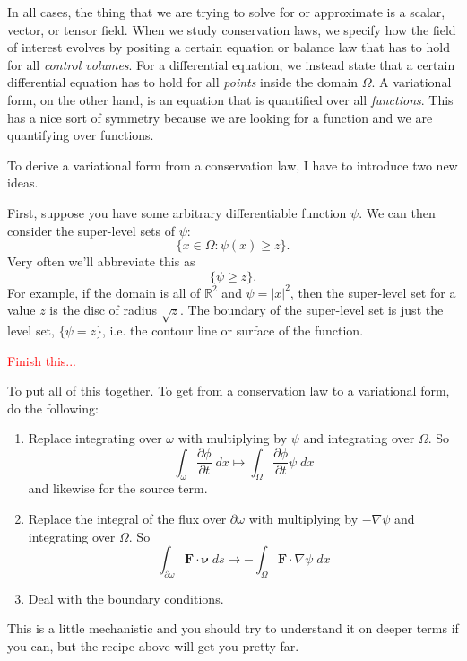 \documentclass{article}
\theoremstyle{definition}
\theoremstyle{plain}
\newcommand{\bs}{\boldsymbol}
\begin{document}
In all cases, the thing that we are trying to solve for or approximate is a scalar, vector, or tensor field.
When we study conservation laws, we specify how the field of interest evolves by positing a certain equation or balance law that has to hold for all \emph{control volumes}.
For a differential equation, we instead state that a certain differential equation has to hold for all \emph{points} inside the domain $\Omega$.
A variational form, on the other hand, is an equation that is quantified over all \emph{functions}.
This has a nice sort of symmetry because we are looking for a function and we are quantifying over functions.

To derive a variational form from a conservation law, I have to introduce two new ideas.

First, suppose you have some arbitrary differentiable function $\psi$.
We can then consider the super-level sets of $\psi$:
\begin{equation}
    \{x \in \Omega: \psi(x) \ge z\}.
\end{equation}
Very often we'll abbreviate this as
\begin{equation}
    \{\psi \ge z\}.
\end{equation}
For example, if the domain is all of $\mathbb{R}^2$ and $\psi = |x|^2$, then the super-level set for a value $z$ is the disc of radius $\sqrt z$.
The boundary of the super-level set is just the level set, $\{\psi = z\}$, i.e. the contour line or surface of the function.

\textcolor{red}{Finish this...}

To put all of this together.
To get from a conservation law to a variational form, do the following:
\begin{enumerate}
    \item Replace integrating over $\omega$ with multiplying by $\psi$ and integrating over $\Omega$.
        So
        \begin{equation}
            \int_\omega\frac{\partial\phi}{\partial t}\; dx \mapsto \int_\Omega \frac{\partial\phi}{\partial t}\psi\; dx
        \end{equation}
        and likewise for the source term.
    \item Replace the integral of the flux over $\partial\omega$ with multiplying by $-\nabla \psi$ and integrating over $\Omega$.
        So
        \begin{equation}
            \int_{\partial\omega}\bs F\cdot\bs \nu\;ds \mapsto -\int_\Omega\bs F\cdot\nabla\psi\;dx
        \end{equation}
    \item Deal with the boundary conditions.
\end{enumerate}
This is a little mechanistic and you should try to understand it on deeper terms if you can, but the recipe above will get you pretty far.

\pagebreak

%
%
\end{document}
